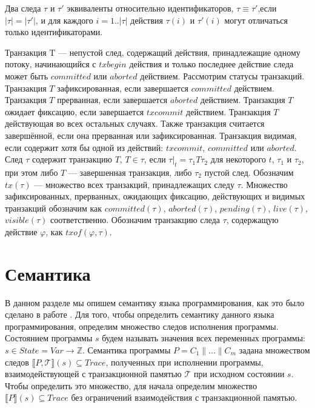 \begin{mydefinition}\label{def3} Два следа $\tau$ и $\tau'$ эквиваленты относительно идентификаторов, $\tau \equiv \tau'$,если $|\tau| = |\tau'|$, и для каждого $i = 1..|\tau|$ действия $\tau(i)$ и $\tau'(i)$ могут отличаться только идентификаторами.
\end{mydefinition}

Транзакция T --- непустой след, содержащий действия, принадлежащие одному потоку, начинающийся с $txbegin$ действия и только последнее действие следа может быть $committed$ или $aborted$ действием. Рассмотрим статусы транзакций. Транзакция $T$ зафиксированная, если завершается $committed$ действием. Транзакция $T$ прерванная, если завершается $aborted$ действием. Транзакция $T$ ожидает фиксацию, если завершается $txcommit$ действием. Транзакция $T$ действующая во всех остальных случаях. Также транзакция считается завершённой, если она прерванная или зафиксированная. Транзакция видимая, если содержит хотя бы одной из действий: $txcommit$, $committed$ или $aborted$. След $\tau$ содержит транзакцию $T$, $T \in \tau$, если $\tau|_t = \tau_1T\tau_2$ для некоторого $t$, $\tau_1$ и $\tau_2$, при этом либо $T$ --- завершенная транзакция, либо $\tau_2$ пустой след. Обозначим $tx(\tau)$ --- множество всех транзакций, принадлежащих следу $\tau$. Множество зафиксированных, прерванных, ожидающих фиксацию, действующих и видимых транзакций обозначим как $committed(\tau)$, $aborted(\tau)$, $pending(\tau)$, $live(\tau)$, $visible(\tau)$ соответственно. Обозначим транзакцию следа $\tau$, содержащую действие $\varphi$, как $txof(\varphi, \tau)$.

\section{Семантика}
В данном разделе мы опишем семантику языка программирования, как это было сделано в работе \cite{tms_article}. Для того, чтобы определить семантику данного языка программирования, определим множество следов исполнения программы. Состоянием программы $s$ будем называть значения всех переменных программы: $s \in State = Var \to \mathbb{Z} $. Семантика программы $P = C_1 \parallel \ldots \parallel C_m$ задана множеством следов $\llbracket P, \mathcal{T} \rrbracket (s) \subseteq Trace$, полученных при исполнении программы, взаимодействующей с транзакционной памятью $\mathcal{T}$ при исходном состоянии $s$. Чтобы определить это множество, для начала определим множество $\llbracket P \rrbracket (s) \subseteq Trace$ без ограничений взаимодействия с транзакционной памятью.

